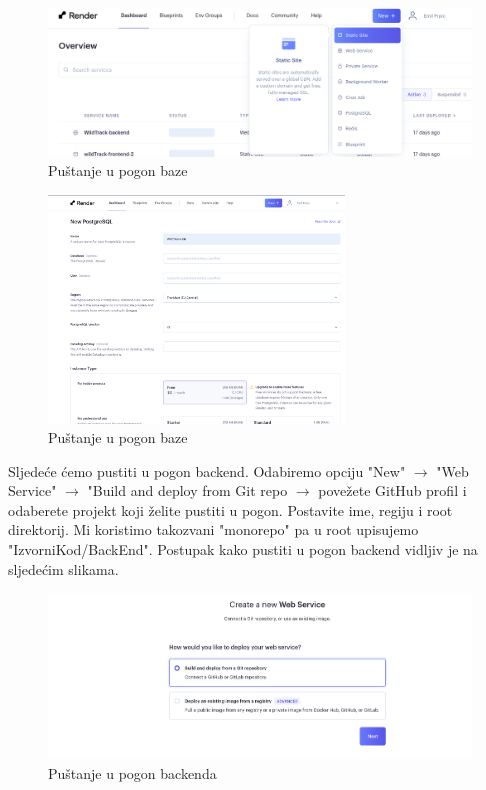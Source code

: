 		
			
			\begin{figure}[H]
				\centering
				\includegraphics[width=\textwidth]{slike/slika1.PNG}
				\caption{Puštanje u pogon baze }
				\label{fig:dijagram_baze}
			\end{figure}
			
			\begin{figure}[H]
				\centering
				\includegraphics[width=0.7\textwidth]{slike/slika2.PNG}
				\caption{Puštanje u pogon baze}
				\label{fig:dijagram_baze}
			\end{figure}
			
			
			Sljedeće ćemo pustiti u pogon backend. Odabiremo opciju "New" $\rightarrow$ "Web Service" $\rightarrow$ "Build and deploy from Git repo $\rightarrow$ povežete GitHub profil i odaberete projekt koji želite pustiti u pogon. Postavite ime, regiju i root direktorij. Mi koristimo takozvani "monorepo" pa u root upisujemo "IzvorniKod/BackEnd". Postupak kako pustiti u pogon backend vidljiv je na sljedećim slikama.
			
			\begin{figure}[H]
				\centering
				\includegraphics[width=\textwidth]{slike/slika3.PNG}
				\caption{Puštanje u pogon backenda }
				\label{fig:dijagram_baze}
			\end{figure}
			
